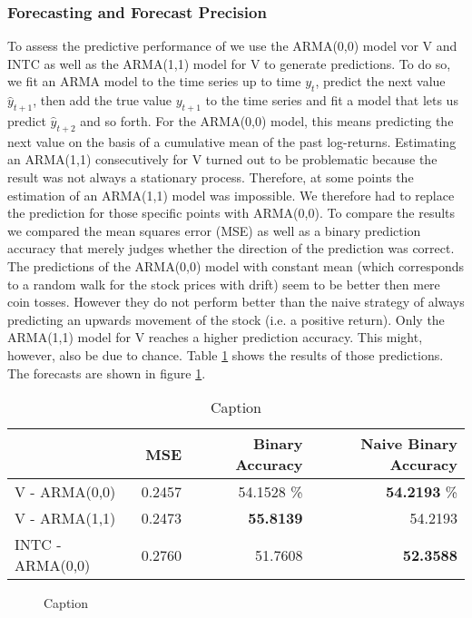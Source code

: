 \subsubsection{Forecasting and Forecast Precision}
To assess the predictive performance of we use the ARMA(0,0) model vor V and INTC as well as the ARMA(1,1) model for V to generate predictions. To do so, we fit an ARMA model to the time series up to time $y_t$, predict the next value $\hat{y}_{t+1}$, then add the true value $y_{t+1}$ to the time series and fit a model that lets us predict $\hat{y}_{t + 2}$ and so forth. For the ARMA(0,0) model, this means predicting the next value on the basis of a cumulative mean of the past log-returns. Estimating an ARMA(1,1) consecutively for V turned out to be problematic because the result was not always a stationary process. Therefore, at some points the estimation of an ARMA(1,1) model was impossible. We therefore had to replace the prediction for those specific points with ARMA(0,0). 
To compare the results we compared the mean squares error (MSE) as well as a binary prediction accuracy that merely judges whether the direction of the prediction was correct. The predictions of the ARMA(0,0) model with constant mean (which corresponds to a random walk for the stock prices with drift) seem to be better then mere coin tosses. However they do not perform better than the naive strategy of always predicting an upwards movement of the stock (i.e. a positive return). Only the ARMA(1,1) model for V reaches a higher prediction accuracy. This might, however, also be due to chance. Table \ref{tab:V_INTC_ARMA_predictions} shows the results of those predictions. The forecasts are shown in figure \ref{fig:V_INTC_ARMA_predictions_plot}. 

\begin{table}[]
    \centering
    \begin{tabular}{lrrr}
    \toprule
    {}  & MSE & Binary Accuracy & Naive Binary Accuracy \\
    \midrule
    V - ARMA(0,0) & 0.2457 & 54.1528 \% & \textbf{54.2193} \% \\
    V - ARMA(1,1) & 0.2473 & \textbf{55.8139} & 54.2193 \\
    INTC - ARMA(0,0) & 0.2760 & 51.7608 & \textbf{52.3588} \\
    \bottomrule
    \end{tabular}
    \caption{Caption}
    \label{tab:V_INTC_ARMA_predictions}
\end{table}{}

\begin{figure}
    \centering
    \caption{Caption}
    \label{fig:V_INTC_ARMA_predictions_plot}
\end{figure}{}



